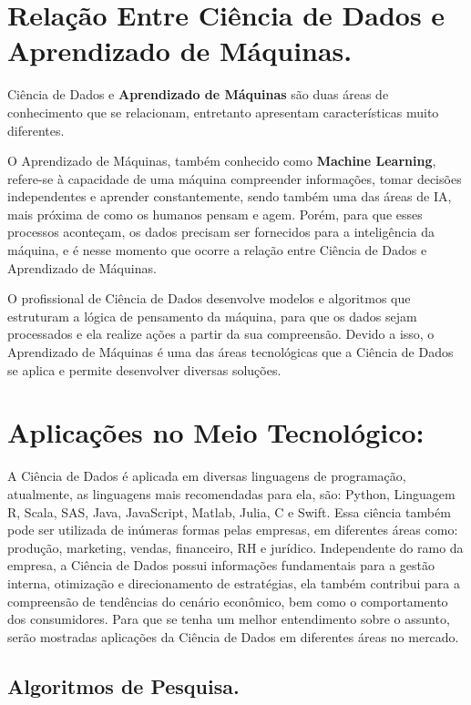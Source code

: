 \documentclass[12pt]{article}
\begin{document}
\section{Relação Entre Ciência de Dados e Aprendizado de Máquinas.}

Ciência de Dados e \textbf{Aprendizado de Máquinas} são duas áreas de conhecimento que se relacionam, entretanto apresentam características muito diferentes.

O Aprendizado de Máquinas, também conhecido como \textbf{Machine Learning}, refere-se à capacidade de uma máquina compreender informações, tomar decisões independentes e aprender constantemente, sendo também uma das áreas de IA, mais próxima de como os humanos pensam e agem. Porém, para que esses processos aconteçam, os dados precisam ser fornecidos para a inteligência da máquina, e é nesse momento que ocorre a relação entre Ciência de Dados e Aprendizado de Máquinas.

O profissional de Ciência de Dados desenvolve modelos e algoritmos que estruturam a lógica de pensamento da máquina, para que os dados sejam processados e ela realize ações a partir da sua compreensão. Devido a isso, o Aprendizado de Máquinas é uma das áreas tecnológicas que a Ciência de Dados se aplica e permite desenvolver diversas soluções.

\section{Aplicações no Meio Tecnológico:}

A Ciência de Dados é aplicada em diversas linguagens de programação, atualmente, as linguagens mais recomendadas para ela, são: Python, Linguagem R, Scala, SAS, Java, JavaScript, Matlab, Julia, C e Swift. Essa ciência também pode ser utilizada de inúmeras formas pelas empresas, em diferentes áreas como: produção, marketing, vendas, financeiro, RH e jurídico. Independente do ramo da empresa, a Ciência de Dados possui informações fundamentais para a gestão interna, otimização e direcionamento de estratégias, ela também contribui para a compreensão de tendências do cenário econômico, bem como o comportamento dos consumidores. Para que se tenha um melhor entendimento sobre o assunto, serão mostradas aplicações da Ciência de Dados em diferentes áreas no mercado.

\subsection{Algoritmos de Pesquisa.}
\end{document}
